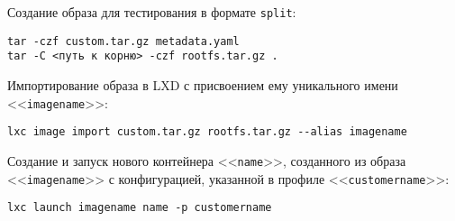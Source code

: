 \documentclass[10pt, a5paper]{article}
\begin{document}
Создание образа для тестирования в формате {\tt split}:
\begin{verbatim}
tar -czf custom.tar.gz metadata.yaml
tar -C <путь к корню> -czf rootfs.tar.gz .
\end{verbatim}

Импортирование образа в {LXD} с присвоением ему уникального имени <<{\tt imagename}>>:
\begin{verbatim}
lxc image import custom.tar.gz rootfs.tar.gz --alias imagename
\end{verbatim}

Создание и запуск нового контейнера <<{\tt name}>>,  созданного из 
образа <<{\tt imagename}>> с конфигурацией, указанной в профиле <<{\tt customername}>>:
\begin{verbatim}
lxc launch imagename name -p customername
\end{verbatim}
\end{document}
